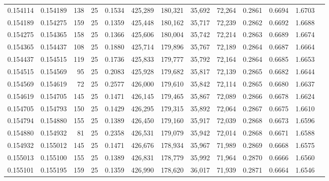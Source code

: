 \begin{tabular}{rrrrrrrrrrrrr}
0.154114 & 0.154189 &   138 &  25 &                                     0.1534 & 425,289 & 180,321 &  35,692 &  72,264 & 0.2861 & 0.6694 & 1.6703 \\
0.154189 & 0.154275 &   159 &  25 &                                     0.1359 & 425,448 & 180,162 &  35,717 &  72,239 & 0.2862 & 0.6692 & 1.6688 \\
0.154275 & 0.154365 &   158 &  25 &                                     0.1366 & 425,606 & 180,004 &  35,742 &  72,214 & 0.2863 & 0.6689 & 1.6674 \\
0.154365 & 0.154437 &   108 &  25 &                                     0.1880 & 425,714 & 179,896 &  35,767 &  72,189 & 0.2864 & 0.6687 & 1.6664 \\
0.154437 & 0.154515 &   119 &  25 &                                     0.1736 & 425,833 & 179,777 &  35,792 &  72,164 & 0.2864 & 0.6685 & 1.6653 \\
0.154515 & 0.154569 &    95 &  25 &                                     0.2083 & 425,928 & 179,682 &  35,817 &  72,139 & 0.2865 & 0.6682 & 1.6644 \\
0.154569 & 0.154619 &    72 &  25 &                                     0.2577 & 426,000 & 179,610 &  35,842 &  72,114 & 0.2865 & 0.6680 & 1.6637 \\
0.154619 & 0.154705 &   145 &  25 &                                     0.1471 & 426,145 & 179,465 &  35,867 &  72,089 & 0.2866 & 0.6678 & 1.6624 \\
0.154705 & 0.154793 &   150 &  25 &                                     0.1429 & 426,295 & 179,315 &  35,892 &  72,064 & 0.2867 & 0.6675 & 1.6610 \\
0.154794 & 0.154880 &   155 &  25 &                                     0.1389 & 426,450 & 179,160 &  35,917 &  72,039 & 0.2868 & 0.6673 & 1.6596 \\
0.154880 & 0.154932 &    81 &  25 &                                     0.2358 & 426,531 & 179,079 &  35,942 &  72,014 & 0.2868 & 0.6671 & 1.6588 \\
0.154932 & 0.155012 &   145 &  25 &                                     0.1471 & 426,676 & 178,934 &  35,967 &  71,989 & 0.2869 & 0.6668 & 1.6575 \\
0.155013 & 0.155100 &   155 &  25 &                                     0.1389 & 426,831 & 178,779 &  35,992 &  71,964 & 0.2870 & 0.6666 & 1.6560 \\
0.155101 & 0.155195 &   159 &  25 &                                     0.1359 & 426,990 & 178,620 &  36,017 &  71,939 & 0.2871 & 0.6664 & 1.6546 \\

\end{tabular}
